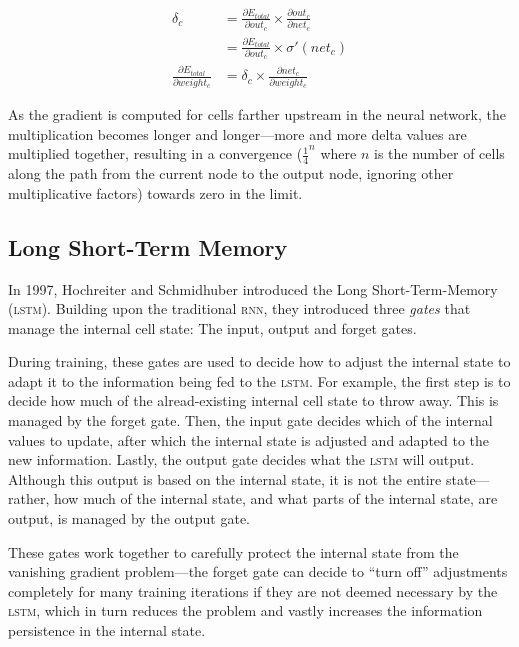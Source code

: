 \begin{multicols}{2}
\begin{Figure}
  \begin{align*}
    \delta_c & =
      \frac{\partial E_{total}}{\partial \mathit{out_c}} \times
      \frac{\partial \mathit{out_c}}{\partial \mathit{net_c}} \\
                 & =
      \frac{\partial E_{total}}{\partial \mathit{out_c}} \times
      \sigma'({net}_c) \\
    \frac{\partial E_{total}}{\partial \mathit{weight_c}} & =
      \delta_c \times
      \frac{\partial \mathit{net_c}}{\partial \mathit{weight_c}}
  \end{align*}
\end{Figure}

\noindent As the gradient is computed for cells farther upstream in the neural
network, the multiplication becomes longer and longer---more and more delta
values are multiplied together, resulting in a convergence ($\frac{1}{4}^n$
where $n$ is the number of cells along the path from the current node to the
output node, ignoring other multiplicative factors) towards zero in the limit.

\subsection{Long Short-Term Memory}

In 1997, Hochreiter and Schmidhuber introduced the Long Short-Term-Memory
(\textsc{lstm}).  Building upon the traditional \textsc{rnn}, they introduced
three \textit{gates} that manage the internal cell state: The input, output and
forget gates.

During training, these gates are used to decide how to adjust the internal state
to adapt it to the information being fed to the \textsc{lstm}.  For example, the
first step is to decide how much of the alread-existing internal cell state to
throw away.  This is managed by the forget gate.  Then, the input gate decides
which of the internal values to update, after which the internal state is
adjusted and adapted to the new information.  Lastly, the output gate decides
what the \textsc{lstm} will output.  Although this output is based on the
internal state, it is not the entire state---rather, how much of the internal
state, and what parts of the internal state, are output, is managed by the
output gate.

These gates work together to carefully protect the internal state from the
vanishing gradient problem---the forget gate can decide to ``turn off''
adjustments completely for many training iterations if they are not deemed
necessary by the \textsc{lstm}, which in turn reduces the problem and vastly
increases the information persistence in the internal state.


\end{multicols}
